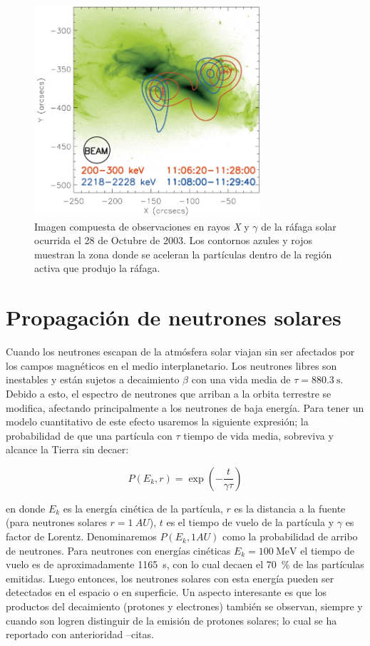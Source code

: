 \begin{figure}
        \centering
        \includegraphics[width=0.75\textwidth]{flare-footprints}
        \caption{Imagen compuesta de observaciones en rayos \emph{X} y $\gamma$ de la ráfaga solar ocurrida el \num{28} de Octubre de \num{2003}. Los contornos azules y rojos muestran la zona donde se aceleran la partículas dentro de la región activa que produjo la ráfaga.}
        \label{fig:flare-foot}
\end{figure}

\section{Propagación de neutrones solares}

Cuando los neutrones escapan de la atmósfera solar viajan sin ser afectados por los campos magnéticos en el medio interplanetario. Los neutrones libres son inestables y están sujetos a decaimiento $\beta$ con una vida media de $\tau=\SI{880.3}{\second}$. Debido a esto, el espectro de neutrones que arriban a la orbita terrestre se modifica, afectando principalmente a los neutrones de baja energía. Para tener un modelo cuantitativo de este efecto usaremos la siguiente expresión; la probabilidad de que una partícula con $\tau$ tiempo de vida media, sobreviva y alcance la Tierra sin decaer:

\begin{equation}
P\left(E_{k},r\right)=\exp\left(-\frac{t}{\gamma\tau}\right)
\end{equation}

en donde $E_{k}$ es la energía cinética de la partícula, $r$ es la distancia a la fuente (para neutrones solares $r=\SI{1}{AU}$), $t$ es el tiempo de vuelo de la partícula y $\gamma$ es factor de Lorentz. Denominaremos $P(E_{k},1AU)$ como la probabilidad de arribo de neutrones. Para neutrones con energías cinéticas $E_{k}=\SI{100}{\mega\electronvolt}$ el tiempo de vuelo es de aproximadamente \SI{1165}{\second}, con lo cual decaen el \SI{70}{\percent} de las partículas emitidas. Luego entonces, los neutrones solares con esta energía pueden ser detectados en el espacio o en superficie. Un aspecto interesante es que los productos del decaimiento (protones y electrones) también se observan, siempre y cuando son logren distinguir de la emisión de protones solares; lo cual se ha reportado con anterioridad --citas.

